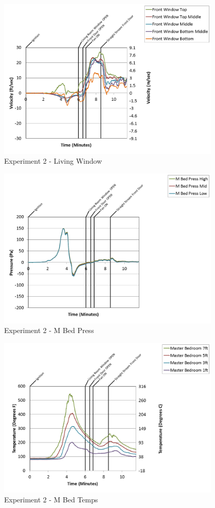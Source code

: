 \documentclass{article}
\begin{document}
\begin{appendices}
\clearpage

\begin{figure}[h!]
	\centering
	\includegraphics[height=3.05in]{0_Images/Results_Charts/Exp_2_Charts/LivingWindow.png}
	\caption{Experiment 2 - Living Window}
\end{figure}


\begin{figure}[h!]
	\centering
	\includegraphics[height=3.05in]{0_Images/Results_Charts/Exp_2_Charts/MBedPress.png}
	\caption{Experiment 2 - M Bed Press}
\end{figure}

\clearpage

\begin{figure}[h!]
	\centering
	\includegraphics[height=3.05in]{0_Images/Results_Charts/Exp_2_Charts/MBedTemps.png}
	\caption{Experiment 2 - M Bed Temps}
\end{figure}



\end{appendices}
\end{document}
